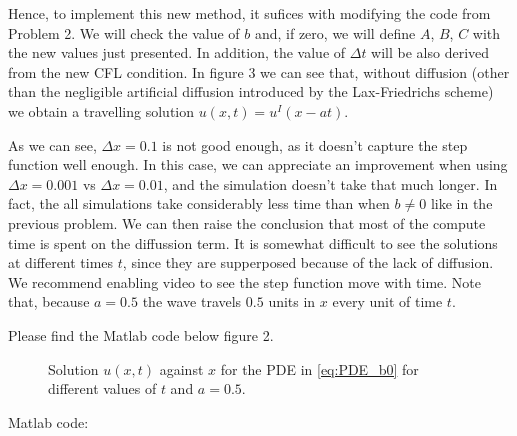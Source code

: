 \begin{questions}
\begin{solution}
Hence, to implement this new method, it sufices with modifying the code from Problem 2. We will check the value of $b$ and, if zero, we will define $A$, $B$, $C$ with the new values just presented. In addition, the value of $\Delta t$ will be also derived from the new CFL condition. In figure 3 we can see that, without diffusion (other than the negligible artificial diffusion introduced by the Lax-Friedrichs scheme) we obtain a travelling solution $u(x,t)=u^I(x-at)$.

As we can see, $\Delta x =0.1$ is not good enough, as it doesn't capture the step function well enough. In this case, we can appreciate an improvement when using $\Delta x=0.001$ vs $\Delta x=0.01$, and the simulation doesn't take that much longer. In fact, the all simulations take considerably less time than when $b\neq 0$ like in the previous problem. We can then raise the conclusion that most of the compute time is spent on the diffussion term. It is somewhat difficult to see the solutions at different times $t$, since they are supperposed because of the lack of diffusion. We recommend enabling video to see the step function move with time. Note that, because $a = 0.5$ the wave travels $0.5$ units in $x$ every unit of time $t$.

Please find the Matlab code below figure 2.
\newpage

\begin{figure}[H]
\centering     %
{}
\hspace{-0.9cm}
\hspace{-0.9cm}
\caption{Solution $u(x,t)$ against $x$ for the PDE in \eqref{eq:PDE_b0} for different values of $t$ and $a=0.5$.}
\end{figure}
Matlab code:

\end{solution}
\end{questions}